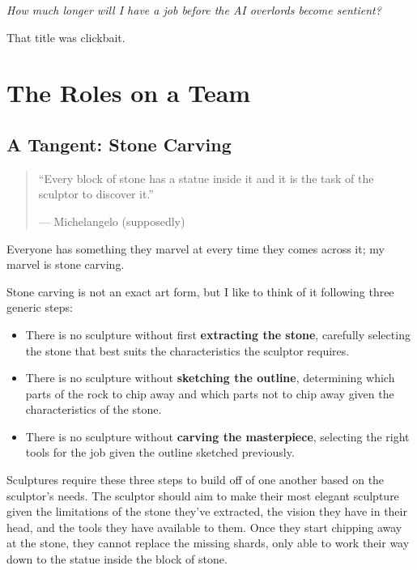 \documentclass[
]{book}
\theoremstyle{definition}
\theoremstyle{definition}
\theoremstyle{definition}
\theoremstyle{definition}
\theoremstyle{remark}
\begin{document}
\emph{How much longer will I have a job before the AI overlords become sentient?}

That title was clickbait.

\hypertarget{the-roles-on-a-team}{%
\chapter{The Roles on a Team}\label{the-roles-on-a-team}}

\hypertarget{a-tangent-stone-carving}{%
\section{A Tangent: Stone Carving}\label{a-tangent-stone-carving}}

\begin{quote}
``Every block of stone has a statue inside it and it is the task of the
sculptor to discover it.''

\hfill --- Michelangelo (supposedly)
\end{quote}

Everyone has something they marvel at every time they comes across it; my marvel
is stone carving.

Stone carving is not an exact art form, but I like to think of it following
three generic steps:

\begin{itemize}
\item
  There is no sculpture without first \textbf{extracting the stone}, carefully
  selecting the stone that best suits the characteristics the sculptor requires.
\item
  There is no sculpture without \textbf{sketching the outline}, determining which
  parts of the rock to chip away and which parts not to chip away given the
  characteristics of the stone.
\item
  There is no sculpture without \textbf{carving the masterpiece}, selecting the
  right tools for the job given the outline sketched previously.
\end{itemize}

Sculptures require these three steps to build off of one another based on
the sculptor's needs. The sculptor should aim to make their most elegant
sculpture given the limitations of the stone they've extracted, the vision they
have in their head, and the tools they have available to them. Once they start
chipping away at the stone, they cannot replace the missing shards, only able
to work their way down to the statue inside the block of stone.
\end{document}
